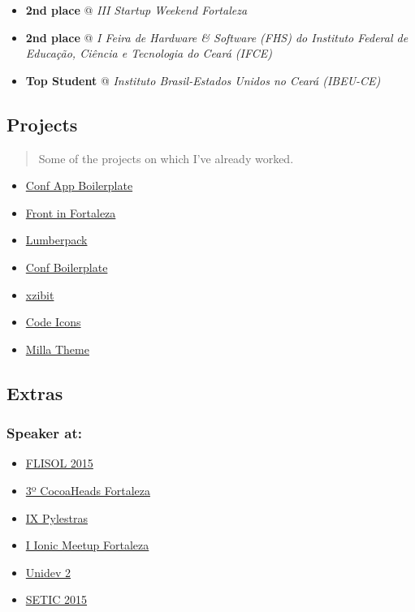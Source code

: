 \documentclass[]{article}
\providecommand{\tightlist}{%
  \setlength{\itemsep}{0pt}\setlength{\parskip}{0pt}}
\begin{document}
\begin{itemize}
\item
  \textbf{2nd place} @ \emph{III Startup Weekend Fortaleza}
\item
  \textbf{2nd place} @ \emph{I Feira de Hardware \& Software (FHS) do
  Instituto Federal de Educação, Ciência e Tecnologia do Ceará (IFCE)}
\item
  \textbf{Top Student} @ \emph{Instituto Brasil-Estados Unidos no Ceará
  (IBEU-CE)}
\end{itemize}

\subsection{Projects}\label{projects}

\begin{quote}
Some of the projects on which I've already worked.
\end{quote}

\begin{itemize}
\tightlist
\item
  \href{https://github.com/devevents/conf-app-boilerplate}{Conf App
  Boilerplate}
\item
  \href{https://play.google.com/store/apps/details?id=com.devevents.frontinfortaleza}{Front
  in Fortaleza}
\item
  \href{https://github.com/mabrasil/lumberpack}{Lumberpack}
\item
  \href{https://github.com/mabrasil/conf-boilerplate}{Conf Boilerplate}
\item
  \href{https://github.com/mabrasil/xzibit}{xzibit}
\item
  \href{https://github.com/mabrasil/codeicons}{Code Icons}
\item
  \href{https://github.com/mabrasil/milla-theme}{Milla Theme}
\end{itemize}

\subsection{Extras}\label{extras}

\subsubsection{Speaker at:}\label{speaker-at}

\begin{itemize}
\tightlist
\item
  \href{http://flisolce.org/}{FLISOL 2015}
\item
  \href{http://www.cocoaheads.com.br/agendas/detalhes/79/}{3º CocoaHeads
  Fortaleza}
\item
  \href{http://pylestras.org/evento/ix-pylestras/}{IX Pylestras}
\item
  \href{http://www.meetup.com/pt/Ionic-Ceara/events/224620543/}{I Ionic
  Meetup Fortaleza}
\item
  \href{http://unidevce.github.io/}{Unidev 2}
\item
  \href{http://www.seti.ufc.br/}{SETIC 2015}
\end{itemize}
\end{document}
